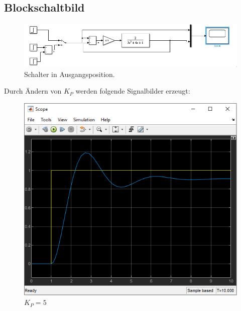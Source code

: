 \documentclass{article}
\begin{document}
		\subsection{Blockschaltbild}
		\begin{figure}[h]
			\includegraphics[scale = 0.69, center]{2_3c/3_c_Regelkreis_schalter_oben.png}
			\caption{Schalter in Ausgangsposition.}
			\label{fig31: Blockschaltbild_Ausgangsposition}
		\end{figure}
		Durch Ändern von $K_P$ werden folgende Signalbilder erzeugt:
		\begin{figure}[h]
			\includegraphics[scale = 0.625, center]{2_3c/5.png}
			\caption{$K_P = 5$}
			\label{fig31: KP_5}
		\end{figure}
\newpage
\end{document}
